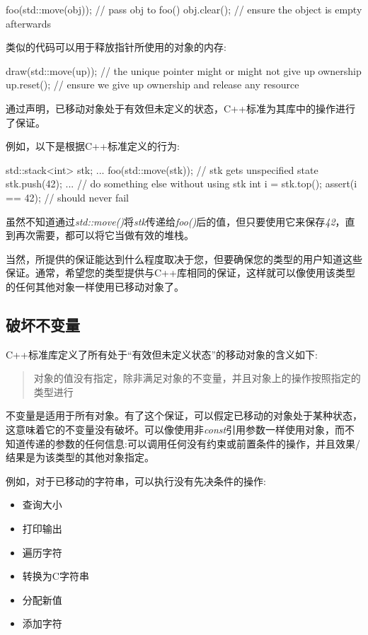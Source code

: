 \begin{cppcode}
foo(std::move(obj)); // pass obj to foo()
obj.clear(); // ensure the object is empty afterwards
\end{cppcode}

类似的代码可以用于释放指针所使用的对象的内存:

\begin{cppcode}
draw(std::move(up)); // the unique pointer might or might not give up ownership
up.reset(); // ensure we give up ownership and release any resource
\end{cppcode}

通过声明，已移动对象处于有效但未定义的状态，C++标准为其库中的操作进行了保证。

例如，以下是根据C++标准定义的行为:

\begin{cppcode}
std::stack<int> stk;
...
foo(std::move(stk)); // stk gets unspecified state
stk.push(42);
... // do something else without using stk
int i = stk.top();
assert(i == 42); // should never fail
\end{cppcode}

虽然不知道通过\textit{std::move()}将\textit{stk}传递给\textit{foo()}后的值，但只要使用它来保存\textit{42}，直到再次需要，都可以将它当做有效的堆栈。

当然，所提供的保证能达到什么程度取决于您，但要确保您的类型的用户知道这些保证。通常，希望您的类型提供与C++库相同的保证，这样就可以像使用该类型的任何其他对象一样使用已移动对象了。

\subsection{破坏不变量}

C++标准库定义了所有处于“有效但未定义状态”的移动对象的含义如下:

\begin{quote}
	对象的值没有指定，除非满足对象的不变量，并且对象上的操作按照指定的类型进行
\end{quote}

不变量是适用于所有对象。有了这个保证，可以假定已移动的对象处于某种状态，这意味着它的不变量没有破坏。可以像使用非\textit{const}引用参数一样使用对象，而不知道传递的参数的任何信息:可以调用任何没有约束或前置条件的操作，并且效果/结果是为该类型的其他对象指定。

例如，对于已移动的字符串，可以执行没有先决条件的操作:

\begin{itemize}
	\item 查询大小
	\item 打印输出
	\item 遍历字符
	\item 转换为C字符串
	\item 分配新值
	\item 添加字符
\end{itemize}

